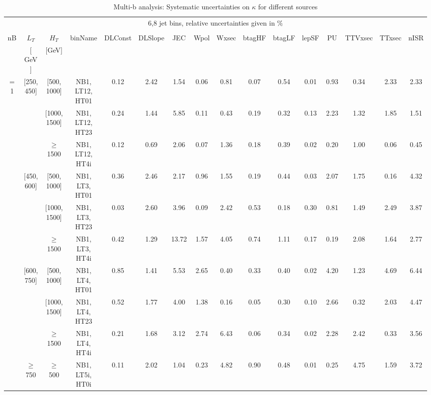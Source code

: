 \begin{table}[ht] 
 \tiny 
\caption{Multi-b analysis: Systematic uncertainties on $\kappa$ for different sources} 
\begin{center} 
\label{tab:sysTable} 
\begin{tabular}{|c | c | c | c | c | c | c | c | c | c | c | c | c | c | c | c | } 
\hline 
\multicolumn{16}{|c|}{6,8 jet bins, relative uncertainties given in \%} \\ 
\multicolumn{16}{|c|}{} \\ \hline 
nB &  $L_T$ & $H_T$ & binName & DLConst & DLSlope & JEC & Wpol & Wxsec & btagHF & btagLF & lepSF & PU & TTVxsec & TTxsec & nISR  \\ 
   & $[$ GeV $]$  &  $[$GeV$]$  &  &  &  &  &  &  &  &  &  &  &  &  &   \\ \hline 
\cline{1-16} $=$ 1 & [250, 450] & [500, 1000]&NB1, LT12, HT01 & 0.12 & 2.42 & 1.54 & 0.06 & 0.81 & 0.07 & 0.54 & 0.01 & 0.93 & 0.34 & 2.33 & 2.33 \\ 
\cline{3-16}  & & [1000, 1500] &NB1, LT12, HT23 & 0.24 & 1.44 & 5.85 & 0.11 & 0.43 & 0.19 & 0.32 & 0.13 & 2.23 & 1.32 & 1.85 & 1.51 \\ 
\cline{3-16}  & & $\geq$ 1500 &NB1, LT12, HT4i & 0.12 & 0.69 & 2.06 & 0.07 & 1.36 & 0.18 & 0.39 & 0.02 & 0.20 & 1.00 & 0.06 & 0.45 \\ 
\cline{2-16}   & [450, 600] & [500, 1000]&NB1, LT3, HT01 & 0.36 & 2.46 & 2.17 & 0.96 & 1.55 & 0.19 & 0.44 & 0.03 & 2.07 & 1.75 & 0.16 & 4.32 \\ 
\cline{3-16}  & & [1000, 1500] &NB1, LT3, HT23 & 0.03 & 2.60 & 3.96 & 0.09 & 2.42 & 0.53 & 0.18 & 0.30 & 0.81 & 1.49 & 2.49 & 3.87 \\ 
\cline{3-16}  & & $\geq$ 1500 &NB1, LT3, HT4i & 0.42 & 1.29 & 13.72 & 1.57 & 4.05 & 0.74 & 1.11 & 0.17 & 0.19 & 2.08 & 1.64 & 2.77 \\ 
\cline{2-16}   & [600, 750] & [500, 1000]&NB1, LT4, HT01 & 0.85 & 1.41 & 5.53 & 2.65 & 0.40 & 0.33 & 0.40 & 0.02 & 4.20 & 1.23 & 4.69 & 6.44 \\ 
\cline{3-16}  & & [1000, 1500] &NB1, LT4, HT23 & 0.52 & 1.77 & 4.00 & 1.38 & 0.16 & 0.05 & 0.30 & 0.10 & 2.66 & 0.32 & 2.03 & 4.47 \\ 
\cline{3-16}  & & $\geq$ 1500 &NB1, LT4, HT4i & 0.21 & 1.68 & 3.12 & 2.74 & 6.43 & 0.06 & 0.34 & 0.02 & 2.28 & 2.42 & 0.33 & 3.56 \\ 
\cline{2-16}   & $\geq$ 750 & $\geq$ 500&NB1, LT5i, HT0i & 0.11 & 2.02 & 1.04 & 0.23 & 4.82 & 0.90 & 0.48 & 0.01 & 0.25 & 4.75 & 1.59 & 3.72 \\ 

\end{tabular}
\end{center}
\end{table}
